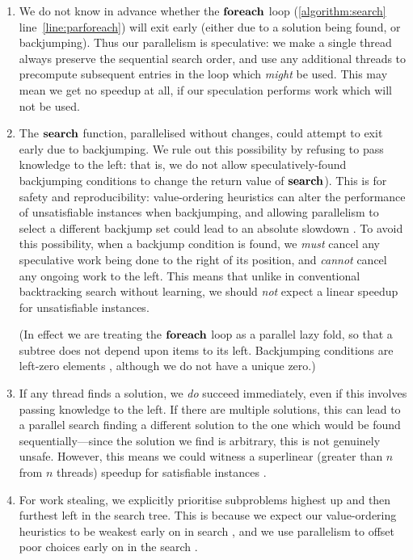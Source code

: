 \documentclass{llncs}
\newcommand{\lineref}[1]{line~\ref{#1}}
\begin{document}
\begin{enumerate}
    \item We do not know in advance whether the $\KwSty{foreach}$ loop (\cref{algorithm:search}
        \lineref{line:parforeach}) will exit early (either due to a solution being found, or
        backjumping). Thus our parallelism is speculative: we make a single thread always preserve
        the sequential search order, and use any additional threads to precompute subsequent entries
        in the loop which \emph{might} be used. This may mean we get no speedup at all, if our
        speculation performs work which will not be used.

    \item The $\KwSty{search}$ function, parallelised without changes, could attempt to exit early
        due to backjumping. We rule out this possibility by refusing to pass knowledge to the left:
        that is, we do not allow speculatively-found backjumping conditions to change the return
        value of $\KwSty{search}$). This is for safety \cite{Trienekens:1990} and reproducibility:
        value-ordering heuristics can alter the performance of unsatisfiable instances when
        backjumping, and allowing parallelism to select a different backjump set could lead to an
        absolute slowdown \cite{Prosser:1993b}. To avoid this possibility, when a backjump condition
        is found, we \emph{must} cancel any speculative work being done to the right of its
        position, and \emph{cannot} cancel any ongoing work to the left.  This means that unlike in
        conventional backtracking search without learning, we should \emph{not} expect a linear
        speedup for unsatisfiable instances.

        (In effect we are treating the $\KwSty{foreach}$ loop as a parallel lazy fold, so that a
        subtree does not depend upon items to its left. Backjumping conditions are left-zero
        elements \cite{Lobachev:2012}, although we do not have a unique zero.)

    \item If any thread finds a solution, we \emph{do} succeed immediately, even if this involves
        passing knowledge to the left. If there are multiple solutions, this can lead to a parallel
        search finding a different solution to the one which would be found sequentially---since the
        solution we find is arbitrary, this is not genuinely unsafe. However, this means we could
        witness a superlinear (greater than $n$ from $n$ threads) speedup for satisfiable instances
        \cite{deBruin:1995}.

    \item For work stealing, we explicitly prioritise subproblems highest up and then furthest left
        in the search tree. This is because we expect our value-ordering heuristics to be weakest
        early on in search \cite{Harvey:1995}, and we use parallelism to offset poor choices early
        on in the search \cite{Chu:2009,McCreesh:2015}.
\end{enumerate}
\end{document}

